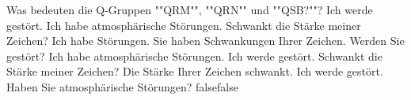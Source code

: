     {Was bedeuten die Q-Gruppen ""QRM"", ""QRN"" und ""QSB?""?}
    {Ich werde gestört. Ich habe atmosphärische Störungen. Schwankt die Stärke meiner Zeichen?}
    {Ich habe Störungen. Sie haben Schwankungen Ihrer Zeichen. Werden Sie gestört?}
    {Ich habe atmosphärische Störungen. Ich werde gestört. Schwankt die Stärke meiner Zeichen?}
    {Die Stärke Ihrer Zeichen schwankt. Ich werde gestört. Haben Sie atmosphärische Störungen?}
    {false}{false}